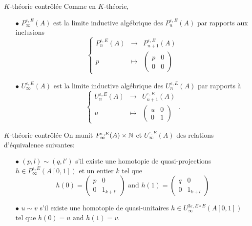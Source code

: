 \begin{frame}{$K$-théorie contrôlée}
Comme en $K$-théorie, 
\begin{itemize}
\item[$\bullet$] $P_\infty^{\varepsilon, E}(A)$ est la limite inductive algébrique des $P_n^{\varepsilon, E}(A)$ par rapports aux inclusions
\[\left\{\begin{array}{rcl}
	P^{\varepsilon,E}_n(A) 		& \rightarrow	& P^{\varepsilon,E}_{n+1}(A)\\ 
	p 		& \mapsto 	& \begin{pmatrix}p& 0 \\ 0&0 \end{pmatrix}
\end{array}\right.\]
\item[$\bullet$] $U_\infty^{\varepsilon, E}(A)$ est la limite inductive algébrique des $U_n^{\varepsilon, E}(A)$ par rapports à
\[\left\{\begin{array}{rcl}
	U^{\varepsilon,E}_n(A) 		& \rightarrow	& U^{\varepsilon,E}_{n+1}(A)\\ 
	u 		& \mapsto 	& \begin{pmatrix}u & 0 \\ 0& 1 \end{pmatrix}
\end{array}\right. .\]
\end{itemize}
\end{frame}

\begin{frame}{$K$-théorie contrôlée}
On munit $P_\infty^{\varepsilon, E}(A)\times \mathbb N$ et $U_\infty^{\varepsilon, E}(A)$ des relations d'équivalence suivantes:
\begin{itemize}
\item[$\bullet$] $(p,l) \sim (q,l')$ s'il existe une homotopie de quasi-projections $h\in P^{\varepsilon, E}_\infty(A[0,1])$ et un entier $k$ tel que 
\[h(0)=\begin{pmatrix} p & 0 \\ 0 & 1_{k+l'} \end{pmatrix} \text{ and }
h(1)=\begin{pmatrix} q & 0 \\ 0 & 1_{k+l} \end{pmatrix}\]
\item[$\bullet$] $u \sim v$ s'il existe une homotopie de quasi-unitaires $h\in U^{3\varepsilon, E\circ E}_\infty(A[0,1])$ tel que $h(0)= u \text{ and }h(1)=v$.\\
\end{itemize}
\end{frame}

